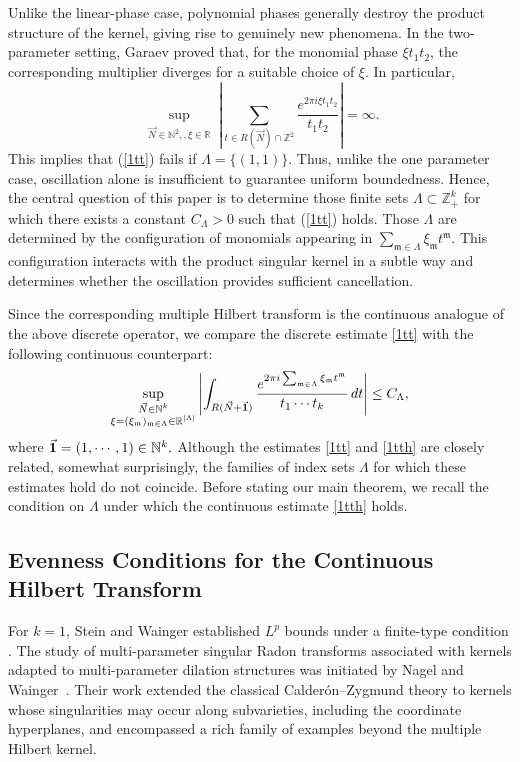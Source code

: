 \documentclass[10pt,a4paper]{amsart}
\numberwithin{equation}{section}
\begin{document}
Unlike the linear-phase case, polynomial phases generally destroy the
product structure of the kernel, giving rise to genuinely new
phenomena.  In the two-parameter setting, Garaev \cite{G} proved that, for the monomial phase
$\xi t_1t_2$, the corresponding multiplier diverges for a suitable choice of $\xi$. In particular,
$$
\sup_{\substack{
		\vec N\in\mathbb N^2,,
		\xi\in\mathbb R}}
\left|
\sum_{t\in R(\vec N)\cap\mathbb Z^2}
\frac{e^{2\pi i\xi t_1t_2}}{t_1t_2}
\right|
=\infty.
$$
This implies that (\ref{1tt}) fails if $\Lambda =\{(1,1)\}$.  Thus, unlike the  one parameter case,
oscillation alone is insufficient to guarantee uniform boundedness. Hence, the central question of this paper is to determine those finite sets $\Lambda\subset\mathbb Z_+^k$
for which there exists a constant $C_\Lambda>0$ such that (\ref{1tt}) holds. Those $\Lambda$ are determined by the configuration of monomials appearing in
$\sum_{\mathfrak m\in\Lambda}\xi_{\mathfrak m}t^{\mathfrak m}$.
This configuration interacts with the product singular kernel in a subtle way
and determines whether the oscillation provides sufficient cancellation.

Since the corresponding multiple Hilbert transform is the continuous
analogue of the above discrete operator, we compare the discrete estimate \eqref{1tt} with the following continuous counterpart:
\begin{align}\label{1tth}
	\sup_{\substack{
			\vec N\in\mathbb N^k\\
			\xi=(\xi_{\mathfrak m})_{\mathfrak m\in\Lambda}\in\mathbb R^{|\Lambda|}
	}}
	\left|
	\int_{R(\vec N+\vec{\bf{1}}) }
	\frac{e^{2\pi i\sum_{\mathfrak m\in\Lambda}
			\xi_{\mathfrak m}t^{\mathfrak m}}}{t_1\cdots t_k}\,
	dt
	\right|
	\le C_\Lambda,
\end{align}where $\vec{\bf{1}}=(1,\cdots,1)\in \mathbb{N}^{k}.$
Although the estimates \eqref{1tt} and \eqref{1tth} are closely related,
somewhat surprisingly, the families of index sets $\Lambda$ for which these estimates hold
do not coincide.
Before stating our main theorem, we recall the condition on $\Lambda$
under which the continuous estimate \eqref{1tth} holds.  

\subsection{Evenness Conditions for the Continuous Hilbert Transform}
For $k=1$, Stein and Wainger established $L^p$ bounds under a finite-type
condition \cite{SW1}.
The study of multi-parameter singular Radon transforms associated with
kernels adapted to multi-parameter dilation structures was initiated by
Nagel and Wainger~\cite{NW}. Their work extended the classical
Calderón--Zygmund theory to kernels whose singularities may occur along
subvarieties, including the coordinate hyperplanes, and encompassed a rich
family of examples beyond the multiple Hilbert kernel.
\end{document}

